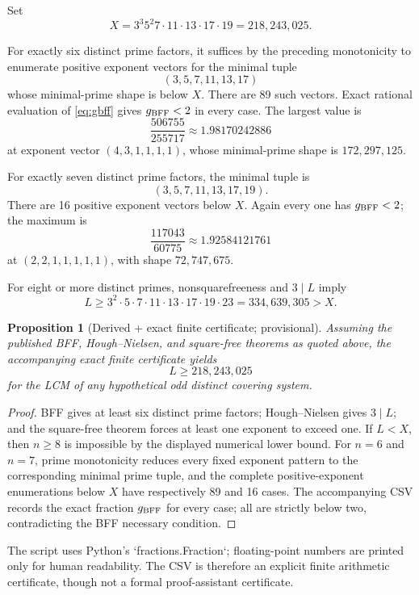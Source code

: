 \documentclass[11pt]{article}
\newtheorem{proposition}[theorem]{Proposition}
\theoremstyle{definition}
\begin{document}
Set
\begin{equation}\label{eq:X}
 X=3^3 5^2 7\cdot11\cdot13\cdot17\cdot19
  =218{,}243{,}025.
\end{equation}

For exactly six distinct prime factors, it suffices by the preceding monotonicity to enumerate
positive exponent vectors for the minimal tuple
\[
 (3,5,7,11,13,17)
\]
whose minimal-prime shape is below $X$.  There are 89 such vectors.  Exact rational evaluation
of \eqref{eq:gbff} gives $g_{\rm BFF}<2$ in every case.  The largest value is
\[
 \frac{506755}{255717}\approx1.98170242886
\]
at exponent vector $(4,3,1,1,1,1)$, whose minimal-prime shape is $172{,}297{,}125$.

For exactly seven distinct prime factors, the minimal tuple is
\[
 (3,5,7,11,13,17,19).
\]
There are 16 positive exponent vectors below $X$.  Again every one has $g_{\rm BFF}<2$; the
maximum is
\[
 \frac{117043}{60775}\approx1.92584121761
\]
at $(2,2,1,1,1,1,1)$, with shape $72{,}747{,}675$.

For eight or more distinct primes, nonsquarefreeness and $3\mid L$ imply
\[
 L\ge3^2\cdot5\cdot7\cdot11\cdot13\cdot17\cdot19\cdot23
   =334{,}639{,}305>X.
\]

\begin{proposition}[Derived + exact finite certificate; provisional]
Assuming the published BFF, Hough--Nielsen, and square-free theorems as quoted above, the
accompanying exact finite certificate yields
\[
 \boxed{L\ge218{,}243{,}025}
\]
for the LCM of any hypothetical odd distinct covering system.
\end{proposition}

\begin{proof}
BFF gives at least six distinct prime factors; Hough--Nielsen gives $3\mid L$; and the
square-free theorem forces at least one exponent to exceed one.  If $L<X$, then $n\ge8$ is
impossible by the displayed numerical lower bound.  For $n=6$ and $n=7$, prime monotonicity
reduces every fixed exponent pattern to the corresponding minimal prime tuple, and the complete
positive-exponent enumerations below $X$ have respectively 89 and 16 cases.  The accompanying
CSV records the exact fraction $g_{\rm BFF}$ for every case; all are strictly below two,
contradicting the BFF necessary condition.
\end{proof}

The script uses Python's `fractions.Fraction`; floating-point numbers are printed only for human
readability.  The CSV is therefore an explicit finite arithmetic certificate, though not a
formal proof-assistant certificate.
\end{document}
